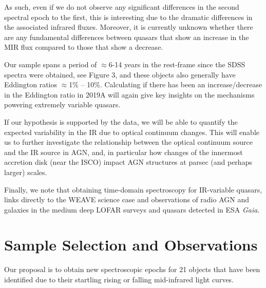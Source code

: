 \documentclass[a4paper,fleqn,usenatbib]{mnras}
\begin{document}
As such, even if we do not observe any significant differences in the
second spectral epoch to the first, this is interesting due to the
dramatic differences in the associated infrared fluxes. Moreover, it
is currently unknown whether there are any fundamental differences
between quasars that show an increase in the MIR flux compared to
those that show a decrease.

Our sample spans a period of $\approx$6-14 years in the rest-frame
since the SDSS spectra were obtained, see Figure 3, and these objects
also generally have Eddington ratios $\approx$1\% -- 10\%. Calculating
if there has been an increase/decrease in the Eddington ratio in 2019A
will again give key insights on the mechanisms powering extremely
variable quasars.

If our hypothesis is supported by the data, we will be able to
quantify the expected variability in the IR due to optical continuum
changes. This will enable us to further investigate the relationship
between the optical continuum source and the IR source in AGN, and, in
particular how changes of the innermost accretion disk (near the ISCO)
impact AGN structures at parsec (and perhaps larger) scales.

Finally, we note that obtaining time-domain spectroscopy for
IR-variable quasars, links directly to the WEAVE science case and
observations of radio AGN and galaxies in the medium deep LOFAR
surveys and quasars detected in ESA {\it Gaia}.





\section{Sample Selection and Observations}\label{sec:data} 



Our proposal is to obtain new spectroscopic epochs for 21 objects that
have been identified due to their startling rising or falling mid-infrared light curves. 
\end{document}
